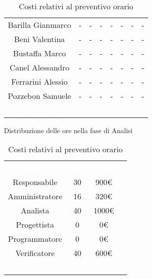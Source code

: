 \begin{table}[h!]
\begin{minipage}[c]{0.53\textwidth}
\begin{tabular}{>{\raggedright\arraybackslash}c|cccccc|c}
		\rowcolor[RGB]{216, 235, 171}
	    	Barilla Gianmarco & - & - & - & - & - & -& -		\\[4pt]
	    \rowcolor[RGB]{233, 245, 206}
	    	Beni Valentina & - & - & - & - & - & -& -			\\[4pt]
	    \rowcolor[RGB]{216, 235, 171}
	    	Bustaffa Marco & - & - & - & - & - & -& -			\\[4pt]
        \rowcolor[RGB]{233, 245, 206}
	    	Canel Alessandro & - & - & - & - & - & -& -			\\[4pt]
        \rowcolor[RGB]{216, 235, 171}
	    	Ferrarini Alessio & - & - & - & - & - & -& -		\\[4pt]
        \rowcolor[RGB]{233, 245, 206}
	    	Pozzebon Samuele & - & - & - & - & - & -& -			\\[4pt]
		\rowcolor[RGB]{47, 106, 73}
			\textcolor{white}{Totale Ruolo} & \textcolor{white}{-} & \textcolor{white}{-} & \textcolor{white}{-} 
			& \textcolor{white}{-} & \textcolor{white}{-} & \textcolor{white}{-}
			& \textcolor{white}{-} \\[4pt]	
    \end{tabular}
    \caption{Distribuzione delle ore nella fase di Analisi}
\end{minipage}
\hfill
\begin{minipage}{0.33\textwidth}
	\centering
	\begin{tabular}{cccc}
	    \rowcolor[RGB]{33, 73, 50}
	    \textcolor{white}{\textbf{Ruolo}} & \textcolor{white}{\textbf{Ore}} & \textcolor{white}{\textbf{Costo}}\\[4pt]
	    \rowcolor[RGB]{216, 235, 171}
	    Responsabile & 30 & 900\euro\\[4pt]
	    \rowcolor[RGB]{233, 245, 206}
	    Amministratore & 16 & 320\euro\\[4pt]
        \rowcolor[RGB]{216, 235, 171}
	    Analista & 40 & 1000\euro\\[4pt]
	    \rowcolor[RGB]{233, 245, 206}
	    Progettista & 0 & 0\euro\\[4pt]
        \rowcolor[RGB]{216, 235, 171}
	    Programmatore & 0 & 0\euro\\[4pt]
	    \rowcolor[RGB]{233, 245, 206}
	    Verificatore & 40 & 600\euro\\[4pt]
		\rowcolor[RGB]{47, 106, 73}
			\textcolor{white}{Totale} & \textcolor{white}{126} & \textcolor{white}{2820\euro}\\[4pt]	
    \end{tabular}	
	\caption{Costi relativi al preventivo orario}

\end{minipage}
\end{table}

